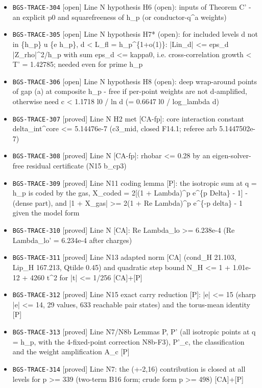 \begin{itemize}
  \item \texttt{BGS-TRACE-304} [open] Line N hypothesis H6 (open): inputs of Theorem C' - an explicit p0 and squarefreeness of h\_p (or conductor-q\textasciicircum{}a weights)
  \item \texttt{BGS-TRACE-305} [open] Line N hypothesis H7* (open): for included levels d not in \{h\_p\} u \{e h\_p\}, d < L\_fl = h\_p\textasciicircum{}\{1+o(1)\}: |Lin\_d| <= eps\_d |Z\_rho|\textasciicircum{}2/h\_p with sum eps\_d <= kappa0, i.e. cross-correlation growth < T' = 1.42785; needed even for prime h\_p
  \item \texttt{BGS-TRACE-306} [open] Line N hypothesis H8 (open): deep wrap-around points of gap (a) at composite h\_p - free if per-point weights are not d-amplified, otherwise need c < 1.1718 l0 / ln d (= 0.6647 l0 / log\_lambda d)
  \item \texttt{BGS-TRACE-307} [proved] Line N H2 met [CA-fp]: core interaction constant delta\_int\textasciicircum{}core <= 5.14476e-7 (c3\_mid, closed F14.1; referee arb 5.1447502e-7)
  \item \texttt{BGS-TRACE-308} [proved] Line N [CA-fp]: rhobar <= 0.28 by an eigen-solver-free residual certificate (N15 b\_cp3)
  \item \texttt{BGS-TRACE-309} [proved] Line N11 coding lemma [P]: the isotropic sum at q = h\_p is coded by the gas, X\_coded = 2[(1 + Lambda)\textasciicircum{}p e\textasciicircum{}\{p Delta\} - 1] - (dense part), and |1 + X\_gas| >= 2(1 + Re Lambda)\textasciicircum{}p e\textasciicircum{}\{-p delta\} - 1 given the model form
  \item \texttt{BGS-TRACE-310} [proved] Line N [CA]: Re Lambda\_lo >= 6.238e-4 (Re Lambda\_lo' = 6.234e-4 after charges)
  \item \texttt{BGS-TRACE-311} [proved] Line N13 adapted norm [CA] (cond\_H 21.103, Lip\_H 167.213, Qtilde 0.45) and quadratic step bound N\_H <= 1 + 1.01e-12 + 4260 t\textasciicircum{}2 for |t| <= 1/256 [CA]+[P]
  \item \texttt{BGS-TRACE-312} [proved] Line N15 exact carry reduction [P]: |e| <= 15 (sharp |e| <= 14, 29 values, 633 reachable pair states) and the torus-mean identity [P]
  \item \texttt{BGS-TRACE-313} [proved] Line N7/N8b Lemmas P, P' (all isotropic points at q = h\_p, with the 4-fixed-point correction N8b-F3), P'\_c, the classification and the weight amplification A\_c [P]
  \item \texttt{BGS-TRACE-314} [proved] Line N7: the (+-2,16) contribution is closed at all levels for p >= 339 (two-term B16 form; crude form p >= 498) [CA]+[P]

\end{itemize}
